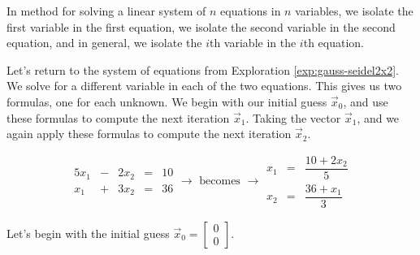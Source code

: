 \documentclass{ximera}
\begin{document}
In  method for solving a linear system of $n$ equations in $n$ variables, we isolate the first variable in the first equation, we isolate the second variable in the second equation, and in general, we isolate the $i$th variable in the $i$th equation.

Let's return to the system of equations from Exploration \ref{exp:gauss-seidel2x2}.  We solve for a different variable in each of the two equations.  This gives us two formulas, one for each unknown.  We begin with our initial guess $\vec{x}_0$, and use these formulas to compute the next iteration $\vec{x}_1$.  Taking the vector $\vec{x}_1$, and we again apply these formulas to compute the next iteration $\vec{x}_2$.


\begin{equation*}\begin{array}{ccccc}
      5x_1& -&2x_2&=&10\\
      x_1 & +&3x_2&= &36 
    \end{array}
 \rightarrow\text{ becomes } \rightarrow
\begin{array}{ccc}
      x_1& =&\dfrac{10+2x_2}{5}\\
      x_2& =&\dfrac{36+x_1}{3}
    \end{array}
\end{equation*}

Let's begin with the initial guess $\vec{x}_0 = \begin{bmatrix} 0\\0 \end{bmatrix}$.
\end{document}
